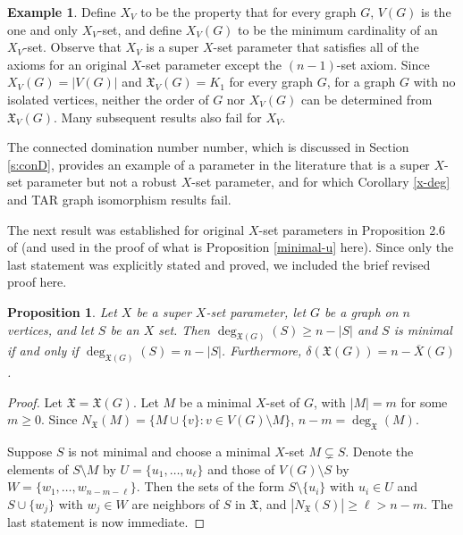 \documentclass{article}
\numberwithin{figure}{section}
\numberwithin{table}{section}
\numberwithin{equation}{section}
\newtheorem{prop}[thm]{Proposition}
\theoremstyle{definition}
\theoremstyle{definition}
\theoremstyle{definition}
\newtheorem{ex}[thm]{Example}
\newcommand{\bpf}{\begin{proof}}
\newcommand{\epf}{\end{proof}\ms}
\newcommand{\ms}{\medskip}
\newcommand{\ol}{\overline}
\newcommand{\xbar}{\ol X}
\newcommand{\xtar}{\mathfrak{X}}%
\newcommand{\X}{\mathfrak{X}}
\begin{document}
{\begin{ex}\label{ex:X=V}  
    Define $X_V$ to be the property that for every graph $G$, $V(G)$ is the one and only $X_V$-set,  and define $X_V(G)$ to be the minimum cardinality of an  $X_V$-set. Observe that  $X_V$ is a super $X$-set parameter that satisfies all of the axioms for an original $X$-set parameter except the $(n-1)$-set axiom. Since   $X_V(G)=|V(G)|$ and  $\xtar_V(G)=K_1$ for every graph $G$, for a graph $G$  with no isolated vertices,  neither the order of  $G$ nor $X_V(G)$ can be determined from $\xtar_V(G)$.  Many subsequent results also fail for  $X_V$.  
\end{ex}

 The connected domination number number, which is discussed in  Section \ref{s:conD}, provides an example of a parameter in the literature that is a super $X$-set parameter but not a robust $X$-set parameter, and for which Corollary \ref{x-deg} and TAR graph isomorphism results fail.








 The next result was established for original $X$-set parameters in Proposition 2.6 of \cite{PDrecon} (and used in the proof of what is Proposition \ref{minimal-u} here).   Since only the last statement was explicitly stated and proved, we included the brief revised proof here.  



 \begin{prop}\label{p:umindegreeTAR}
Let $X$ be a super $X$-set parameter, let $G$ be a graph on $n$ vertices, and let  $S$ be an $X$ set. 
Then $\deg_{\xtar(G)}(S)\ge n-|S|$ and $S$ is minimal if and only if $\deg_{\xtar(G)}(S)=n-|S|$.  Furthermore, $\delta(\xtar(G))=n-\xbar(G)$.
\end{prop}


\bpf
Let
$\X=\xtar(G)$.   
Let $M$ be a minimal $X$-set of $G$, with $|M|=m$ for some $m\geq 0$.  Since $N_{\X}(M)=\{M \cup \{v\}: v \in V(G)\setminus M\}$,  $n-m=\deg_{\X}(M)$. %

 Suppose $S$ is not minimal and choose a minimal $X$-set  $M \subsetneq S$. Denote the elements of $S\setminus M$ by $U= \{u_1,\ldots,u_\ell\} $ and those of  $V(G)\setminus S$ by $W=\{w_1,\ldots, w_{n-m-\ell} \}$. Then the sets of the form $S\setminus \{u_i\}$ with $u_i \in U$ and $S \cup  \{w_j\}$ with $w_j \in W$ are neighbors of $S$ in ${\X}$, and $|N_{\X}(S)| \geq \ell > n-m$. 
The last statement is  now immediate.  
\epf

}
\end{document}
